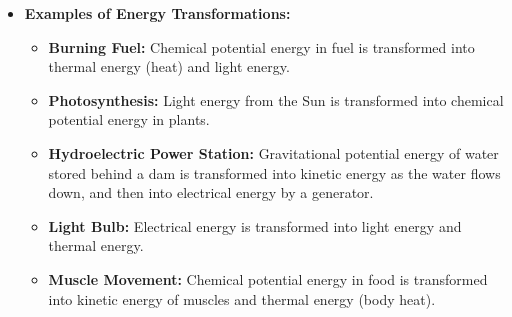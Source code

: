 \begin{itemize}
    \item \textbf{Examples of Energy Transformations:}
        \begin{itemize}
            \item \textbf{Burning Fuel:} Chemical potential energy in fuel is transformed into thermal energy (heat) and light energy.
            \item \textbf{Photosynthesis:} Light energy from the Sun is transformed into chemical potential energy in plants.
            \item \textbf{Hydroelectric Power Station:} Gravitational potential energy of water stored behind a dam is transformed into kinetic energy as the water flows down, and then into electrical energy by a generator.
            \item \textbf{Light Bulb:} Electrical energy is transformed into light energy and thermal energy.
            \item \textbf{Muscle Movement:} Chemical potential energy in food is transformed into kinetic energy of muscles and thermal energy (body heat).
        \end{itemize}
\end{itemize}

